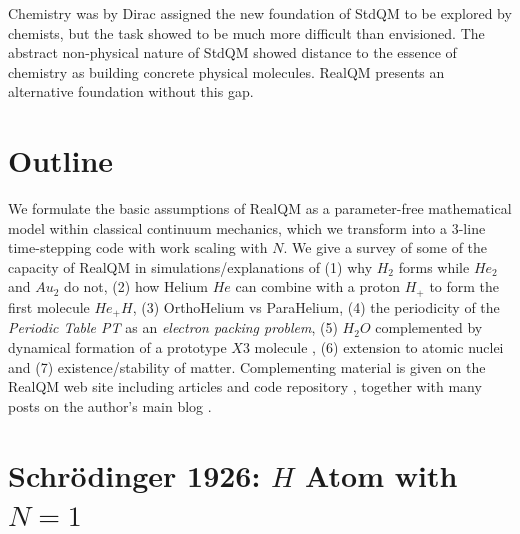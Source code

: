\documentclass[11pt]{article} %
\begin{document}
Chemistry was by Dirac assigned the new foundation of StdQM to be explored by chemists,  but the task showed to be much more difficult than envisioned.  The abstract non-physical nature of StdQM showed distance to the essence of chemistry as building concrete physical molecules.  RealQM presents an alternative foundation without this gap.


\section{Outline}

We formulate the basic assumptions of RealQM as a parameter-free mathematical model within classical continuum mechanics,  which we transform into a 3-line time-stepping code with work scaling with $N$.  We give a survey of some of the capacity of RealQM in simulations/explanations  of (1) why $H_2$ forms while $He_2$ and $Au_2$ do not,  (2) how Helium $He$ can combine with a proton $H_+$ to form the first molecule $He_+H$,  (3) OrthoHelium vs ParaHelium,  (4) the periodicity of the \emph{Periodic Table PT} as an \emph{electron packing problem},  (5) $H_2O$ complemented by dynamical formation of a prototype $X3$ molecule , (6) extension to atomic nuclei and (7) existence/stability of matter.  Complementing material is given on the RealQM web site \cite{RealQM} including articles \cite{articles} and code repository \cite{coderepository}, together with many posts on the author's main blog \cite{Chemistry}.

 
\section{Schr\"odinger 1926: $H$ Atom with  $N=1$}
\end{document}
